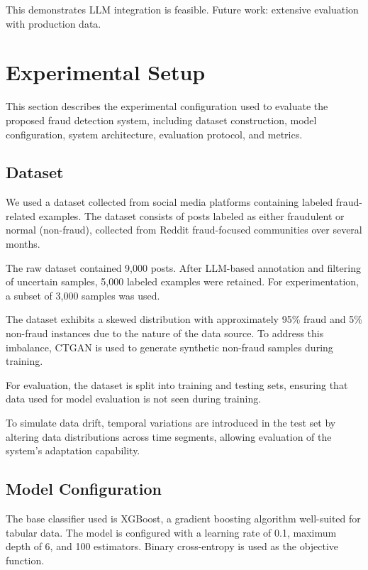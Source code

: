 \documentclass{svproc}
\begin{document}
This demonstrates LLM integration is feasible. Future work: extensive evaluation with production data.

\section{Experimental Setup}\label{sec:experimental}

This section describes the experimental configuration used to evaluate the proposed fraud detection system, including dataset construction, model configuration, system architecture, evaluation protocol, and metrics.

\subsection{Dataset}

We used a dataset collected from social media platforms containing labeled fraud-related examples. The dataset consists of posts labeled as either fraudulent or normal (non-fraud), collected from Reddit fraud-focused communities over several months.

The raw dataset contained 9,000 posts. After LLM-based annotation and filtering of uncertain samples, 5,000 labeled examples were retained. For experimentation, a subset of 3,000 samples was used.

The dataset exhibits a skewed distribution with approximately 95\% fraud and 5\% non-fraud instances due to the nature of the data source. To address this imbalance, CTGAN is used to generate synthetic non-fraud samples during training.

For evaluation, the dataset is split into training and testing sets, ensuring that data used for model evaluation is not seen during training.

To simulate data drift, temporal variations are introduced in the test set by altering data distributions across time segments, allowing evaluation of the system’s adaptation capability.

\subsection{Model Configuration}

The base classifier used is XGBoost, a gradient boosting algorithm well-suited for tabular data. The model is configured with a learning rate of 0.1, maximum depth of 6, and 100 estimators. Binary cross-entropy is used as the objective function.
\end{document}
